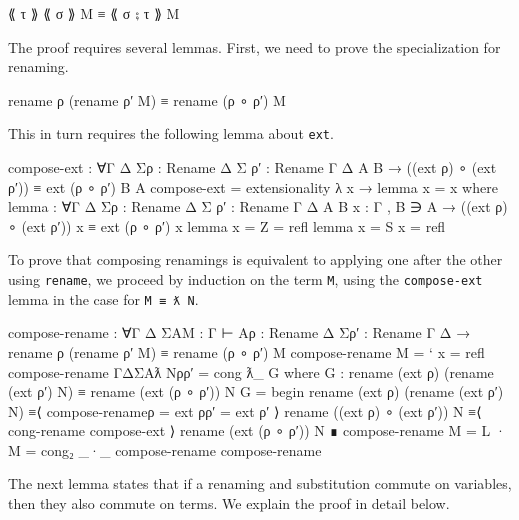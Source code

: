 \begin{myDisplay}
⟪ τ ⟫ ⟪ σ ⟫ M  ≡ ⟪ σ ⨟ τ ⟫ M
\end{myDisplay}

The proof requires several lemmas. First, we need to prove the
specialization for renaming.

\begin{myDisplay}
rename ρ (rename ρ′ M) ≡ rename (ρ ∘ ρ′) M
\end{myDisplay}

This in turn requires the following lemma about \texttt{ext}.

\begin{fence}
\begin{code}
compose-ext : ∀{Γ Δ Σ}{ρ : Rename Δ Σ} {ρ′ : Rename Γ Δ} {A B}
            → ((ext ρ) ∘ (ext ρ′)) ≡ ext (ρ ∘ ρ′) {B} {A}
compose-ext = extensionality λ x → lemma {x = x}
  where
  lemma : ∀{Γ Δ Σ}{ρ : Rename Δ Σ} {ρ′ : Rename Γ Δ} {A B} {x : Γ , B ∋ A}
              → ((ext ρ) ∘ (ext ρ′)) x ≡ ext (ρ ∘ ρ′) x
  lemma {x = Z} = refl
  lemma {x = S x} = refl
\end{code}
\end{fence}

To prove that composing renamings is equivalent to applying one after
the other using \texttt{rename}, we proceed by induction on the term
\texttt{M}, using the \texttt{compose-ext} lemma in the case for
\texttt{M\ ≡\ ƛ\ N}.

\begin{fence}
\begin{code}
compose-rename : ∀{Γ Δ Σ}{A}{M : Γ ⊢ A}{ρ : Rename Δ Σ}{ρ′ : Rename Γ Δ}
  → rename ρ (rename ρ′ M) ≡ rename (ρ ∘ ρ′) M
compose-rename {M = ` x} = refl
compose-rename {Γ}{Δ}{Σ}{A}{ƛ N}{ρ}{ρ′} = cong ƛ_ G
  where
  G : rename (ext ρ) (rename (ext ρ′) N) ≡ rename (ext (ρ ∘ ρ′)) N
  G =
      begin
        rename (ext ρ) (rename (ext ρ′) N)
      ≡⟨ compose-rename{ρ = ext ρ}{ρ′ = ext ρ′} ⟩
        rename ((ext ρ) ∘ (ext ρ′)) N
      ≡⟨ cong-rename compose-ext ⟩
        rename (ext (ρ ∘ ρ′)) N
      ∎
compose-rename {M = L · M} = cong₂ _·_ compose-rename compose-rename
\end{code}
\end{fence}

The next lemma states that if a renaming and substitution commute on
variables, then they also commute on terms. We explain the proof in
detail below.

